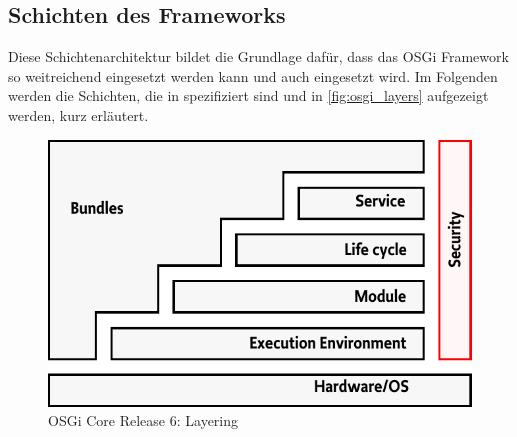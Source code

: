 \subsection{Schichten des Frameworks}
Diese Schichtenarchitektur bildet die Grundlage dafür, dass das \ac{OSGi} Framework so weitreichend eingesetzt werden kann und auch eingesetzt wird.
Im Folgenden werden die Schichten, die in \cite{osgi_r6} spezifiziert sind und in \autoref{fig:osgi_layers} aufgezeigt werden, kurz erläutert.

\begin{figure}[ht]
 \centering
 \includegraphics[scale=0.55]{content/pictures/osgi_layers.png}
 \caption{OSGi Core Release 6: Layering \cite[S. 10]{osgi_r6}}
 \label{fig:osgi_layers}
\end{figure}

